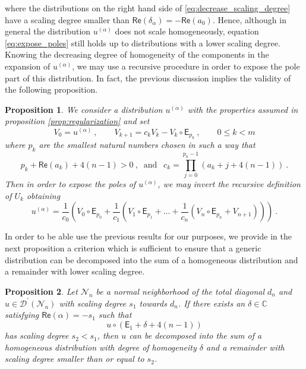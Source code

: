 \documentclass[11pt]{book}
\renewcommand{\Re}{\mathsf{Re}}
\newcommand{\Dcal}{\mathcal{D}}
\newcommand{\Ncal}{\mathcal{N}}
\newcommand{\Cbb}{\mathbb{C}}
\newcommand{\Esf}{\mathsf{E}}
\theoremstyle{break}
\newtheorem{proposition}{Proposition}[chapter]
\begin{document}
%
where the distributions on the right hand side of \eqref{eq:decrease_scaling_degree} have a scaling degree smaller than $\Re(\delta_\alpha) = - \Re (a_0)$. Hence, although in general the distribution $u^{(\alpha)}$ does not scale homogeneously, equation \eqref{eq:expose_poles} still holds up to distributions with a lower scaling degree. Knowing the decreasing degree of homogeneity of the components in the expansion of $u^{(\alpha)}$, we may use a recursive procedure in order to expose the pole part of this distribution. In fact, the previous discussion implies the validity of the following proposition.


\begin{proposition}\label{prop:expose_poles}
We consider a distribution $u^{(\alpha)}$ with the properties assumed in proposition \ref{prop:regularization} and set
%
\begin{equation*}
V_0 = u^{(\alpha)} \ , \qquad V_{k+1} = c_k V_k - V_k \circ \Esf_{p_k} \ , \qquad 0 \leq k < m 
\end{equation*}
%
where $p_k$ are the smallest natural numbers chosen in such a way that 
%
\begin{equation*}
p_k+\Re(a_k)+4(n-1)>0 \ , \ \mbox{ and } \ \ c_k = \prod_{j=0}^{p_k-1} \left(a_k+j+4(n-1)\right) \ .
\end{equation*}
%
Then in order to expose the poles of $u^{(\alpha)}$, we may invert the recursive definition of $U_k$ obtaining
%
\begin{equation*}
u^{(\alpha)} = \frac{1}{c_0} \left( V_0\circ \Esf_{p_0} +  \frac{1}{c_1} \left( V_1 \circ \Esf_{p_1} +\dots + \frac{1}{c_n} \left( V_n \circ \Esf_{p_n} + V_{n+1} \right) \right) \right) \ .
\end{equation*}
%
\end{proposition}


In order to be able use the previous results for our purposes, we provide in the next proposition a criterion which is sufficient to ensure that a generic distribution can be decomposed into the sum of a homogeneous distribution and a remainder with lower scaling degree. 


\begin{proposition}\label{prop:set}
Let $\Ncal_n$ be a normal neighborhood of the total diagonal $d_n$ and $u \in \Dcal^\prime(\Ncal_n)$ with scaling degree $s_1$ towards $d_n$. If there exists an $\delta\in\Cbb$ satisfying $\Re(\alpha)=-s_1$ such that
%
\begin{equation*}
u\circ(\Esf_1+\delta+4(n-1)) 
\end{equation*}
%
has scaling degree $s_2 < s_1$, then $u$ can be decomposed into the sum of a homogeneous distribution with degree of homogeneity $\delta$ and a remainder with scaling degree smaller than or equal to $s_2$.
\end{proposition}
\end{document}
